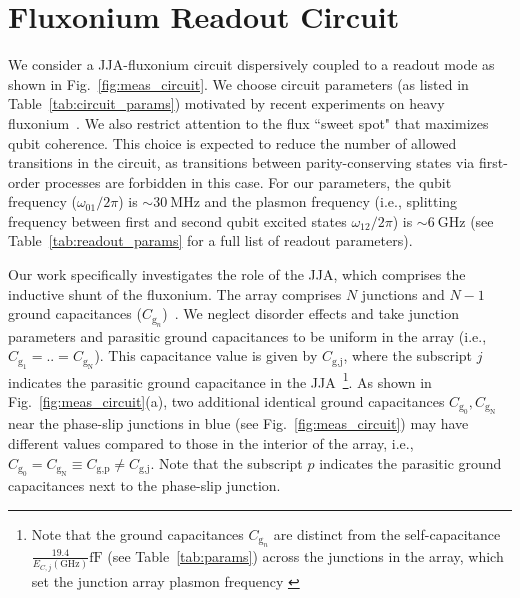 \documentclass[%
reprint,
superscriptaddress,
 amsmath,amssymb,
 aps,
 prx,
longbibliography,
floatfix,
]{revtex4-2}
\begin{document}
\section{Fluxonium Readout Circuit}\label{sec:Fluxonium}


We consider a JJA-fluxonium circuit dispersively coupled to a readout mode as shown in Fig.~\ref{fig:meas_circuit}. We choose circuit parameters (as listed in Table~\ref{tab:circuit_params}) motivated by recent experiments on heavy fluxonium~\cite{zhang_tunable_2024,zhang_universal_2021, ding_high-fidelity_2023}. We also restrict attention to the flux ``sweet spot" that maximizes qubit coherence. This choice is expected to reduce the number of allowed transitions in the circuit, as transitions between parity-conserving states via first-order processes are forbidden in this case. For our parameters, the qubit frequency ($\omega_{01}/2\pi$) is $\sim 30 \ \mathrm{MHz}$ and the plasmon frequency (i.e., splitting frequency between first and second qubit excited states $\omega_{12}/2\pi$) is $\sim 6 \ \mathrm{GHz}$ (see Table~\ref{tab:readout_params} for a full list of readout parameters).
 

Our work specifically investigates the role of the JJA, which comprises the inductive shunt of the fluxonium. The array comprises $N$ junctions and $N-1$ ground capacitances ($C_{\textrm{g}_n}$)~\cite{manucharyan2009fluxonium}. We neglect disorder effects and take junction parameters and parasitic ground capacitances to be uniform in the array (i.e., $C_{\textrm{g}_1}=..=C_{\textrm{g}_\textrm{N}}$). This capacitance value is given by $C_\textrm{g,j}$, where the subscript $j$ indicates the parasitic ground capacitance in the JJA~\footnote{Note that the ground capacitances $C_{\textrm{g}_n}$ are distinct from the self-capacitance $\frac{19.4}{E_{C,j}(\mathrm{GHz})}\mathrm{fF}$ (see Table~\ref{tab:params}) across the junctions in the array, which set the junction array plasmon frequency \cite{catelani2011relaxation}}. As shown in Fig.~\ref{fig:meas_circuit}(a), two additional identical ground capacitances $C_{\textrm{g}_0}, C_{\textrm{g}_\textrm{N}}$ near the phase-slip junctions in blue (see Fig.~\ref{fig:meas_circuit}) may have different values compared to those in the interior of the array, i.e., $C_{\textrm{g}_0}=C_{\textrm{g}_\textrm{N}}\equiv C_\textrm{g,p}\neq C_\textrm{g,j}$. Note that the subscript $p$ indicates the parasitic ground capacitances next to the phase-slip junction.
\end{document}
